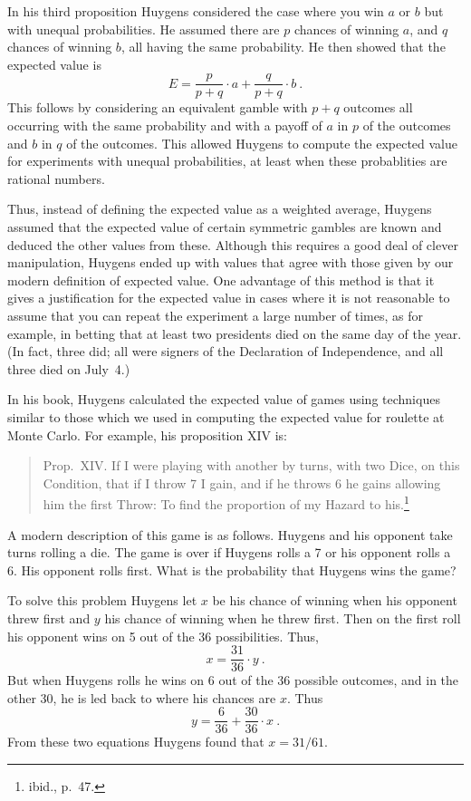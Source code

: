In his third proposition Huygens considered the case where you win $a$ or $b$ but
with unequal probabilities.  He assumed there are $p$ chances of winning
$a$, and $q$ chances of winning $b$, all having the same probability.  He then showed
that the expected value is
$$ E = \frac p{p + q} \cdot a + \frac q{p + q} \cdot b\ .
$$ This follows by considering an equivalent gamble with $p + q$ outcomes all
occurring with the same probability and with a payoff of $a$ in $p$ of the outcomes
and $b$ in $q$ of the outcomes.  This allowed Huygens to compute the expected value
for experiments with unequal probabilities, at least when these probablities are
rational numbers.
\par
Thus, instead of defining the expected value as a weighted average, Huygens assumed
that the expected value of certain symmetric gambles are known and deduced the other
values from these.  Although this requires a good deal of clever manipulation,
Huygens ended up with values that agree with those given by our modern definition of
expected value.  One advantage of this method is that it gives a justification for
the expected value in cases where it is not reasonable to assume that you can repeat
the experiment a large number of times, as for example, in betting that at least two
presidents died on the same day of the year.  (In fact, three did; all were signers
of the Declaration of Independence, and all three died on July~4.)
\par
In his book, Huygens calculated the expected value of games using techniques similar
to those which we used in computing the expected value for roulette at Monte Carlo. 
For example, his proposition XIV is:

\begin{quote} Prop.~XIV. If I were playing with another by turns, with two Dice, on
this Condition, that if I throw 7 I gain, and if he throws 6 he gains allowing him
the first Throw: To find the proportion of my Hazard to his.\footnote{ibid., p.~47.}
\end{quote}
\par A modern description of this game is as follows.  Huygens and his opponent take
turns rolling a die.  The game is over if Huygens rolls a 7 or his opponent rolls a
6.  His opponent rolls first.  What is the probability that Huygens wins the game?
\par  To solve this problem Huygens let
$x$ be his chance of winning when his opponent threw first and $y$ his chance of
winning when he threw first.  Then on the first roll his opponent wins on 5 out of
the 36 possibilities.  Thus,
$$ x = \frac {31}{36} \cdot y\ .
$$ But when Huygens rolls he wins on 6 out of the 36 possible outcomes, and in the
other 30, he is led back to where his chances are $x$.  Thus
$$ y = \frac 6{36} + \frac {30}{36} \cdot x\ .
$$ From these two equations Huygens found that $x = 31/61$.

